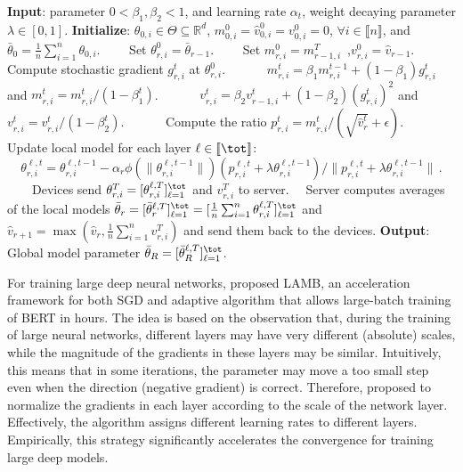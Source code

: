 \documentclass[manuscript,screen,review]{acmart}
\begin{document}
\begin{algorithm}[t]
\caption{\algo\ } \label{alg:ldams}
\begin{algorithmic}[1]
\STATE \textbf{Input}: parameter $0< \beta_1, \beta_2 <1$, and learning rate $\alpha_t$, weight decaying parameter $\lambda \in [0,1]$.
\STATE \textbf{Initialize}: $\theta_{0,i} \in \Theta \subseteq \mathbb R^d $, $m^0_{0,i}=\hat v^0_{0,i}=v^0_{0,i} = 0$, $\forall i\in \llbracket n\rrbracket$, and $\bar{\theta}_0 =  \frac{1}{n} \sum_{i=1}^n \theta_{0,i}$.
\STATE $\qquad$Set $\theta_{r,i}^{0} = \bar{\theta}_{r-1}$.
\STATE $\qquad$Set $m^{0}_{r,i} = m^T_{r-1,i}$\ ,\quad $v^{0}_{r,i} = \hat{v}_{r-1}$.
\STATE $\qquad\quad$Compute stochastic gradient $g^t_{r,i}$ at $\theta_{r,i}^{0}$.
\STATE $\qquad\quad$$m^t_{r,i} = \beta_1 m^{t-1}_{r,i} + (1 - \beta_1) g^t_{r,i}$ and $m^{t}_{r,i}=m^{t}_{r,i} /\left(1-\beta_{1}^{t}\right)$. \label{line:new1}
\STATE $\qquad\quad$$v^{t}_{r,i} = \beta_2 v^{t}_{r-1,i} + (1 - \beta_2) (g^t_{r,i})^2$ and $v^{t}_{r,i}=v^{t}_{r,i} /\left(1-\beta_{2}^{t}\right)$. \label{line:new2}
\STATE $\qquad\quad$Compute the ratio  $p_{r,i}^t=m^{t}_{r,i}/(\sqrt{\hat v^{t}_{r}}+\epsilon)$. \label{line:scale}
\STATE $\qquad\quad$Update local model for each layer $\ell \in \llbracket \tot \rrbracket$: \label{line:layer}
\begin{equation}\label{eq:upadtelayer}
    \theta_{r,i}^{\ell,t}=\theta_{r,i}^{\ell,t-1}-\alpha_{r} \phi(\|\theta_{r,i}^{\ell,t-1}\|)(p_{r,i}^{\ell,t}+\lambda \theta_{r,i}^{\ell,t-1})/ \|p_{r,i}^{\ell,t}+\lambda \theta_{r,i}^{\ell,t-1}\|\, .
\end{equation}
\ENDFOR
\STATE $\qquad$Devices send $\theta_{r,i}^{T} = [\theta_{r,i}^{\ell,T}]_{\ell =1}^{\tot}$ and $v_{r,i}^T$ to server.
\ENDFOR
\STATE $\quad$Server computes averages of the local models $\bar{\theta}_r = [\bar{\theta}_r^{\ell,T}]_{\ell =1}^{\tot} = [\frac{1}{n} \sum_{i=1}^n \theta_{r,i}^{\ell,T}]_{\ell =1}^{\tot}$ and $\hat{v}_{r+1} = \max( \hat{v}_{r},\frac{1}{n} \sum_{i=1}^n v^T_{r,i} )$ and send them back to the devices. \label{line:final}
\ENDFOR
\STATE \textbf{Output}: Global model parameter $\bar{\theta}_R = [\bar{\theta}_R^{\ell,T}]_{\ell =1}^{\tot}$.
\end{algorithmic}
\end{algorithm}

For training large deep neural networks, \cite{you2019large} proposed LAMB, an acceleration framework for both SGD and adaptive algorithm that allows large-batch training of BERT in hours. The idea is based on the observation that, during the training of large neural networks, different layers may have very different (absolute) scales, while the magnitude of the gradients in these layers may be similar. Intuitively, this means that in some iterations, the parameter may move a too small step even when the direction (negative gradient) is correct. Therefore, \cite{you2019large} proposed to normalize the gradients in each layer according to the scale of the network layer. Effectively, the algorithm assigns different learning rates to different layers. Empirically, this strategy significantly accelerates the convergence for training large deep models.
\end{document}
